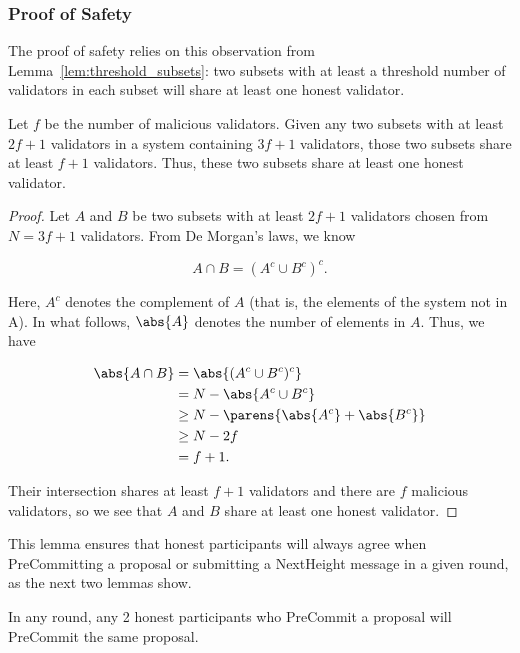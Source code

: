 \subsubsection{Proof of Safety}

The proof of safety relies on this observation from
Lemma~\ref{lem:threshold_subsets}: two subsets with at least
a threshold number of validators in each subset will share at least one
honest validator.

\begin{lem}
\label{lem:threshold_subsets}
Let $f$ be the number of malicious validators.
Given any two subsets with at least $2f+1$ validators in a system
containing $3f+1$ validators, those two subsets share at least $f+1$ validators.
Thus, these two subsets share at least one honest validator.
\end{lem}

\begin{proof}
Let $A$ and $B$ be two subsets with at least $2f+1$ validators
chosen from $N = 3f+1$ validators.
From De Morgan’s laws, we know

\begin{equation*}
    A \cap B = (A^{c} \cup B^{c})^{c}.
\end{equation*}

\noindent
Here, $A^{c}$ denotes the complement of $A$ (that is, the elements of the
system not in A).
In what follows, $\abs{A}$ denotes the number of elements in $A$.
Thus, we have

\begin{align*}
    \abs{A\cap B} &= \abs{(A^{c} \cup B^{c})^{c}} \\
        &= N - \abs{A^{c} \cup B^{c}} \\
        &\ge N - \parens{\abs{A^{c}} + \abs{B^{c}}} \\
        &\ge N - 2f \\
        &= f + 1.
\end{align*}

\noindent
Their intersection shares at least $f+1$ validators and there are $f$
malicious validators, so we see that $A$ and $B$ share at least one honest
validator.
\end{proof}

This lemma ensures that honest participants will always agree when
PreCommitting a proposal or submitting a NextHeight message in a given
round, as the next two lemmas show.

\begin{lem}
\label{lem:2_honest_precommit}
In any round, any 2 honest participants who PreCommit a proposal will PreCommit
the same proposal.
\end{lem}

